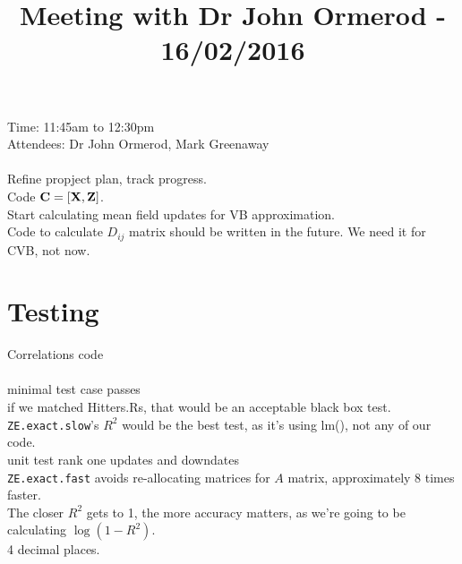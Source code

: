 \documentclass{amsart}
\title{Meeting with Dr John Ormerod - 16/02/2016}
\begin{document}
\maketitle

Time: 11:45am to 12:30pm \\
Attendees: Dr John Ormerod, Mark Greenaway \\
 \\
Refine propject plan, track progress. \\
Code ${\bf C} = [{\bf X}, {\bf Z}]$. \\
Start calculating mean field updates for VB approximation. \\
Code to calculate $D_{ij}$ matrix should be written in the future. We need it for CVB, not now. \\

\section{Testing}
Correlations code \\
 \\
minimal test case passes \\
if we matched Hitters.Rs, that would be an acceptable black box test. \\
\texttt{ZE.exact.slow}'s $R^2$ would be the best test, as it's using lm(), not any of our code. \\
unit test rank one updates and downdates \\
\texttt{ZE.exact.fast} avoids re-allocating matrices for $A$ matrix, approximately 8 times faster. \\
The closer $R^2$ gets to 1, the more accuracy matters, as we're going to be calculating $\log (1 - R^2)$. \\
4 decimal places. \\
\end{document}
